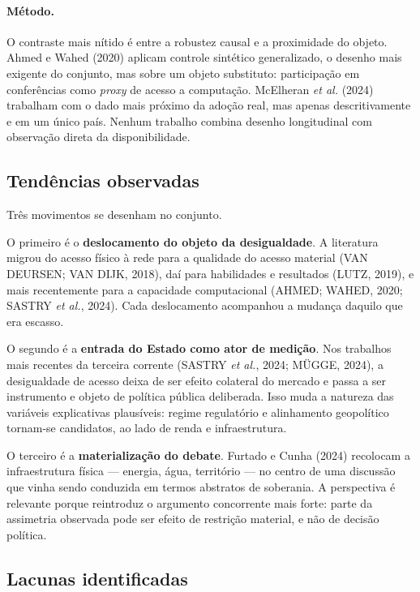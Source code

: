 \documentclass[12pt,a4paper]{article}
\begin{document}
\paragraph{Método.} O contraste mais nítido é entre a robustez causal e a proximidade
do objeto. Ahmed e Wahed (2020) aplicam controle sintético generalizado, o desenho
mais exigente do conjunto, mas sobre um objeto substituto: participação em
conferências como \emph{proxy} de acesso a computação. McElheran \textit{et al.} (2024)
trabalham com o dado mais próximo da adoção real, mas apenas descritivamente e em um
único país. Nenhum trabalho combina desenho longitudinal com observação direta da
disponibilidade.

\subsection{Tendências observadas}

Três movimentos se desenham no conjunto.

O primeiro é o \textbf{deslocamento do objeto da desigualdade}. A literatura migrou do
acesso físico à rede para a qualidade do acesso material (VAN DEURSEN; VAN DIJK, 2018), daí
para habilidades e resultados (LUTZ, 2019), e mais recentemente para a capacidade
computacional (AHMED; WAHED, 2020; SASTRY \textit{et al.}, 2024). Cada deslocamento acompanhou a mudança
daquilo que era escasso.

O segundo é a \textbf{entrada do Estado como ator de medição}. Nos trabalhos mais
recentes da terceira corrente (SASTRY \textit{et al.}, 2024; MÜGGE, 2024), a desigualdade de acesso
deixa de ser efeito colateral do mercado e passa a ser instrumento e objeto de
política pública deliberada. Isso muda a natureza das variáveis explicativas
plausíveis: regime regulatório e alinhamento geopolítico tornam-se candidatos, ao lado
de renda e infraestrutura.

O terceiro é a \textbf{materialização do debate}. Furtado e Cunha (2024) recolocam a
infraestrutura física --- energia, água, território --- no centro de uma discussão que
vinha sendo conduzida em termos abstratos de soberania. A perspectiva é relevante
porque reintroduz o argumento concorrente mais forte: parte da assimetria observada
pode ser efeito de restrição material, e não de decisão política.

\subsection{Lacunas identificadas}
\end{document}
